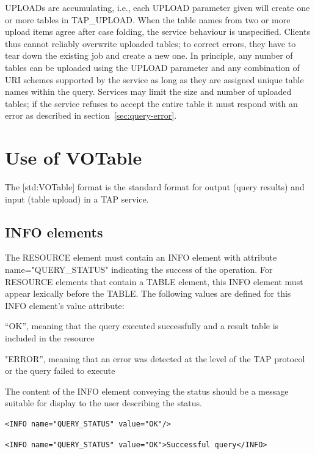 \documentclass[11pt,letter]{ivoa}
\begin{document}
{UPLOADs are accumulating, i.e., each UPLOAD parameter given will create one or 
more tables in TAP\_UPLOAD. When the table names from two or more 
upload items agree after case folding, the service behaviour is unspecified. 
Clients thus cannot reliably overwrite uploaded tables; to correct errors, they 
have to tear down the existing job and create a new one. In principle, any 
number of tables can be uploaded using the UPLOAD parameter and any combination 
of URI schemes supported by the service as long as they are assigned unique 
table names within the query. Services may limit the size and number of 
uploaded tables; if the service refuses to accept the entire table it must 
respond with an error as described in section~\ref{sec:query-error}.


\section{Use of VOTable}
\label{sec:votable}

The [std:VOTable] format is the standard format for output (query results) and 
input (table upload) in a TAP service. 


\subsection{INFO elements}
\label{sec:vot-info}

The RESOURCE element must contain an INFO element with attribute 
name="QUERY\_STATUS" indicating the success of the operation. For 
RESOURCE elements that contain a TABLE element, this INFO element must appear 
lexically before the TABLE. The following values are defined for this INFO 
element's value attribute:

“OK”, meaning that the query executed successfully and a result table is 
included in the resource 

"ERROR”, meaning that an error was detected at the level of the TAP 
protocol or the query failed to execute 

The content of the INFO element conveying the status should be a message 
suitable for display to the user describing the status.

\begin{verbatim}
<INFO name="QUERY_STATUS" value="OK"/>
\end{verbatim}
 
\begin{verbatim}
<INFO name="QUERY_STATUS" value="OK">Successful query</INFO>
\end{verbatim}

}
\end{document}
